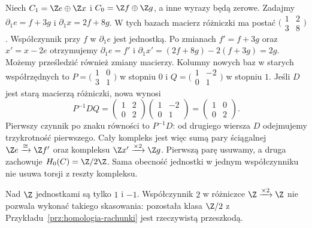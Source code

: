 \begin{przyklad}
Niech $C_1=\Z e\oplus\Z x$ i
$C_0=\Z f\oplus\Z g$, a inne wyrazy będą zerowe.
Zadajmy $\partial_1e=f+3g$ i
$\partial_1x=2f+8g$. W tych bazach macierz różniczki
ma postać $\bigl(\begin{smallmatrix}1&2\\3&8\end{smallmatrix}\bigr)$.
Współczynnik przy $f$ w $\partial_1e$ jest jednostką.
Po zmianach $f'=f+3g$ oraz $x'=x-2e$ otrzymujemy
$\partial_1e=f'$ i
$\partial_1x'=(2f+8g)-2(f+3g)=2g$.
Możemy prześledzić również zmiany macierzy.
Kolumny nowych baz w starych współrzędnych to
$P=\bigl(\begin{smallmatrix}1&0\\3&1\end{smallmatrix}\bigr)$
w stopniu $0$ i
$Q=\bigl(\begin{smallmatrix}1&-2\\0&1\end{smallmatrix}\bigr)$
w stopniu $1$.
Jeśli $D$ jest starą macierzą różniczki, nowa wynosi
\[
 P^{-1}DQ
 =\begin{pmatrix}1&2\\0&2\end{pmatrix}
  \begin{pmatrix}1&-2\\0&1\end{pmatrix}
 =\begin{pmatrix}1&0\\0&2\end{pmatrix}.
\]
Pierwszy czynnik po znaku równości to $P^{-1}D$:
od drugiego wiersza $D$ odejmujemy trzykrotność pierwszego.
Cały kompleks jest więc sumą pary ściągalnej
$\Z e\xrightarrow{\cong}\Z f'$ oraz kompleksu
$\Z x'\xrightarrow{\times2}\Z g$.
Pierwszą parę usuwamy, a druga zachowuje
$H_0(C)=\Z/2\Z$. Sama obecność jednostki w jednym
współczynniku nie usuwa torsji z reszty kompleksu.
\end{przyklad}

Nad $\Z$ jednostkami są tylko $1$ i $-1$.
Współczynnik $2$ w różniczce
$\Z\xrightarrow{\times2}\Z$ nie pozwala
wykonać takiego skasowania: pozostała
klasa $\Z/2$ z
Przykładu~\ref{prz:homologia-rachunki}
jest rzeczywistą przeszkodą.

